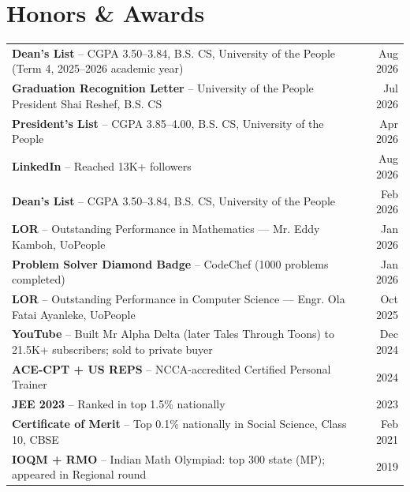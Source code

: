 \documentclass[letterpaper,11pt]{article}
\begin{document}
\section{Honors \& Awards}
 \begin{itemize}[leftmargin=0.15in, label={}]
    \small{\item{
     \begin{tabular*}{0.97\textwidth}[t]{l@{\extracolsep{\fill}}r}
       \textbf{Dean's List} -- CGPA 3.50--3.84, B.S. CS, University of the People (Term 4, 2025--2026 academic year) & Aug 2026 \\[0pt]
       \textbf{Graduation Recognition Letter} -- University of the People President Shai Reshef, B.S. CS & Jul 2026 \\[0pt]
       \textbf{President's List} -- CGPA 3.85--4.00, B.S. CS, University of the People & Apr 2026 \\[0pt]
       \textbf{LinkedIn} -- Reached 13K+ followers & Aug 2026 \\[0pt]
       \textbf{Dean's List} -- CGPA 3.50--3.84, B.S. CS, University of the People & Feb 2026 \\[0pt]
       \textbf{LOR} -- Outstanding Performance in Mathematics --- Mr. Eddy Kamboh, UoPeople & Jan 2026 \\[0pt]
       \textbf{Problem Solver Diamond Badge} -- CodeChef (1000 problems completed) & Jan 2026 \\[0pt]
       \textbf{LOR} -- Outstanding Performance in Computer Science --- Engr. Ola Fatai Ayanleke, UoPeople & Oct 2025 \\[0pt]
       \textbf{YouTube} -- Built Mr Alpha Delta (later Tales Through Toons) to 21.5K+ subscribers; sold to private buyer & Dec 2024 \\[0pt]
       \textbf{ACE-CPT + US REPS} -- NCCA-accredited Certified Personal Trainer & 2024 \\[0pt]
       \textbf{JEE 2023} -- Ranked in top 1.5\% nationally & 2023 \\[0pt]
       \textbf{Certificate of Merit} -- Top 0.1\% nationally in Social Science, Class 10, CBSE & Feb 2021 \\[0pt]
       \textbf{IOQM + RMO} -- Indian Math Olympiad: top 300 state (MP); appeared in Regional round & 2019 \\
     \end{tabular*}
    }}
 \end{itemize}

\end{document}
